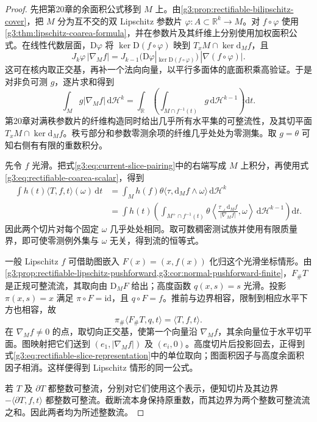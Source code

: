 \begin{proof}
	先把第20章的余面积公式移到 \(M\) 上。由\cref{g3:prop:rectifiable-bilipschitz-cover}，把 \(M\) 分为互不交的双 Lipschitz 参数片 \(\varphi:A\subset\mathbb R^k\to M\)。对 \(f\circ\varphi\) 使用\cref{g3:thm:lipschitz-coarea-formula}，并在参数片及其纤维上分别使用加权面积公式。在线性代数层面，\(\mathrm D\varphi\) 将 \(\ker\mathrm D(f\circ\varphi)\) 映到 \(T_xM\cap\ker\mathrm d_Mf\)，且
	\[
		J_k\varphi\,|\nabla_Mf|
		=J_{k-1}\bigl(\mathrm D\varphi|_{\ker\mathrm D(f\circ\varphi)}\bigr)
		\,|\nabla(f\circ\varphi)|.
	\]
	这可在核内取正交基，再补一个法向向量，以平行多面体的底面积乘高验证。于是对非负可测 \(g\)，逐片求和得到
	\begin{equation}\label{g3:eq:rectifiable-coarea-scalar}
		\int_M g|\nabla_Mf|\,\mathrm d\mathcal H^k
		=\int_{\mathbb R}\left(\int_{M\cap f^{-1}(t)}g\,\mathrm d\mathcal H^{k-1}\right)\mathrm dt.
	\end{equation}
	第20章对满秩参数片的纤维构造同时给出几乎所有水平集的可整流性，及其切平面 \(T_xM\cap\ker\mathrm d_Mf\)。秩亏部分和参数零测余项的纤维几乎处处为零测集。取 \(g=\theta\) 可知右侧有有限的重数积分。

	先令 \(f\) 光滑。把式\eqref{g3:eq:current-slice-pairing}中的右端写成 \(M\) 上积分，再使用式\eqref{g3:eq:rectifiable-coarea-scalar}，得到
	\[
	\begin{aligned}
		\int h(t)\langle T,f,t\rangle(\omega)\,\mathrm dt
		&=\int_M h(f)\theta\langle\tau,\mathrm d_Mf\wedge\omega\rangle\,\mathrm d\mathcal H^k\\
		&=\int h(t)\left(\int_{M^+\cap f^{-1}(t)}
		\theta\left\langle\frac{\tau\mathbin{\lrcorner}\mathrm d_Mf}{|\nabla_Mf|},\omega\right\rangle
		\,\mathrm d\mathcal H^{k-1}\right)\mathrm dt.
	\end{aligned}
	\]
	因此两个切片对每个固定 \(\omega\) 几乎处处相同。取可数稠密测试族并使用有限质量界，即可使零测例外集与 \(\omega\) 无关，得到流的恒等式。

	一般 Lipschitz \(f\) 可借助图嵌入 \(F(x)=(x,f(x))\) 化归这个光滑坐标情形。由\cref{g3:prop:rectifiable-lipschitz-pushforward,g3:cor:normal-pushforward-finite}，\(F_\#T\) 是正规可整流流，其取向由 \(\mathrm D_MF\) 给出；高度函数 \(q(x,s)=s\) 光滑。投影 \(\pi(x,s)=x\) 满足 \(\pi\circ F=\mathrm{id}\)，且 \(q\circ F=f\)。推前与边界相容，限制到相应水平下方也相容，故
	\[
		\pi_\#\langle F_\#T,q,t\rangle=\langle T,f,t\rangle.
	\]
	在 \(\nabla_Mf\ne0\) 的点，取切向正交基，使第一个向量沿 \(\nabla_Mf\)，其余向量位于水平切平面。图映射把它们送到 \((e_1,|\nabla_Mf|)\) 及 \((e_i,0)\)。高度切片后投影回去，正得到式\eqref{g3:eq:rectifiable-slice-representation}中的单位取向；图面积因子与高度余面积因子相消。这样便得到 Lipschitz 情形的同一公式。

	若 \(T\) 及 \(\partial T\) 都整数可整流，分别对它们使用这个表示，便知切片及其边界 \(-\langle\partial T,f,t\rangle\) 都整数可整流。截断流本身保持原重数，而其边界为两个整数可整流流之和。因此两者均为所述整数流。
\end{proof}

